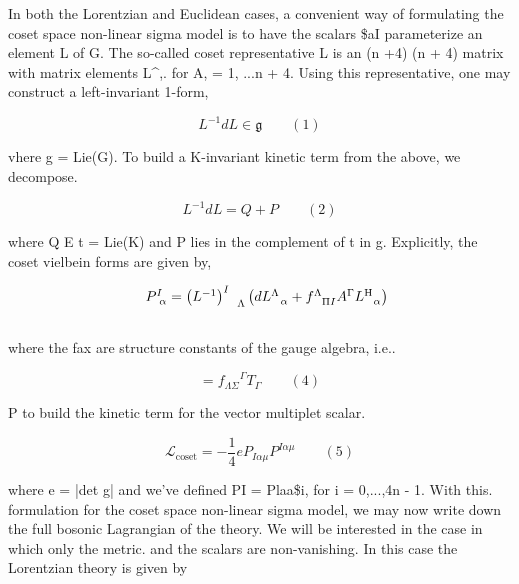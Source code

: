 \documentclass{article}
\begin{document}
\sloppy

In both the Lorentzian and Euclidean cases, a convenient way of formulating the coset
space non-linear sigma model is to have the scalars \$aI parameterize an element L of G.
The so-called coset representative L is an (n +4)  (n + 4) matrix with matrix elements L\textasciicircum{},.
for A,  = 1, ...n + 4. Using this representative, one may construct a left-invariant 1-form,


\begin{equation}
L ^ { - 1 } d L \in \mathfrak { g } \qquad ( 1 )
\end{equation}


vhere g = Lie(G). To build a K-invariant kinetic term from the above, we decompose.


\begin{equation}
L ^ { - 1 } d L = Q + P \qquad ( 2 )
\end{equation}


where Q E t = Lie(K) and P lies in the complement of t in g. Explicitly, the coset vielbein
forms are given by,


\begin{equation}
\begin{array} { r l } & { P _ { ~ \alpha } ^ { I } = \left ( L ^ { - 1 } \right ) _ { ~ ~ ~ \Lambda } ^ { I } \left ( d L _ { ~ ~ \alpha } ^ { \Lambda } + f _ { ~ ~ \Pi I } ^ { \Lambda } A ^ { \Gamma } L _ { ~ ~ \alpha } ^ { \mathrm { H } } \right ) } \\ & { \qquad }\end{array}
\end{equation}


where the fax are structure constants of the gauge algebra, i.e..


\begin{equation}
[ T _ { \Lambda }, T _ { \Sigma } ] = { f _ { \Lambda \Sigma } } ^ { \Gamma } T _ { \Gamma } \qquad ( 4 )
\end{equation}


P to build the kinetic term for the vector multiplet scalar.


\begin{equation}
\mathcal { L } _ { \mathrm { c o s e t } } = - \frac { 1 } { 4 } e P _ { I \alpha \mu } P ^ { I \alpha \mu } \qquad ( 5 )
\end{equation}


where e = |det g| and we've defined PI = Plaa\$i, for i = 0,...,4n - 1. With this.
formulation for the coset space non-linear sigma model, we may now write down the full
bosonic Lagrangian of the theory. We will be interested in the case in which only the metric.
and the scalars are non-vanishing. In this case the Lorentzian theory is given by
\end{document}
